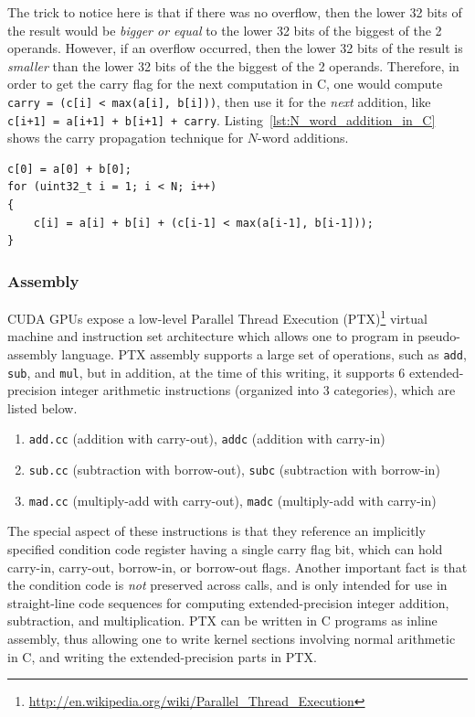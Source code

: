 \documentclass[12pt, a4paper]{report}
\begin{document}
\begin{sloppypar}
The trick to notice here is that if there was no overflow, then the lower 32
bits of the result would be \emph{bigger or equal} to the lower 32 bits of the
biggest of the 2 operands.
However, if an overflow occurred, then the lower 32 bits of the result is
\emph{smaller} than the lower 32 bits of the the biggest of the 2 operands.
Therefore, in order to get the carry flag for the next computation in C, one
would compute \verb!carry = (c[i] < max(a[i], b[i]))!, then use it for the
\emph{next} addition, like \verb!c[i+1] = a[i+1] + b[i+1] + carry!.
Listing~\ref{lst:N_word_addition_in_C} shows the carry propagation technique for
$N$-word additions.

\begin{lstlisting}
c[0] = a[0] + b[0];
for (uint32_t i = 1; i < N; i++)
{
    c[i] = a[i] + b[i] + (c[i-1] < max(a[i-1], b[i-1]));
}
\end{lstlisting}

\subsubsection{Assembly}
CUDA GPUs expose a low-level Parallel Thread Execution (PTX)\footnote{\url{http://en.wikipedia.org/wiki/Parallel_Thread_Execution}} virtual
machine and instruction set architecture which allows one to program in
pseudo-assembly language.
PTX assembly supports a large set of operations, such as \verb+add+, \verb+sub+,
and \verb+mul+, but in addition, at the time of this writing, it supports 6
extended-precision integer arithmetic instructions (organized into 3
categories), which are listed below.

\begin{enumerate}
\item \verb+add.cc+ (addition with carry-out), \verb+addc+ (addition with
carry-in)
\item \verb+sub.cc+ (subtraction with borrow-out), \verb+subc+ (subtraction with
borrow-in)
\item \verb+mad.cc+ (multiply-add with carry-out), \verb+madc+ (multiply-add
with carry-in)
\end{enumerate}

The special aspect of these instructions is that they reference an implicitly
specified condition code register having a single carry flag bit, which can hold
carry-in, carry-out, borrow-in, or borrow-out flags.
Another important fact is that the condition code is \emph{not} preserved across
calls, and is only intended for use in straight-line code sequences for
computing extended-precision integer addition, subtraction, and multiplication.
PTX can be written in C programs as inline assembly, thus allowing one to write
kernel sections involving normal arithmetic in C, and writing the
extended-precision parts in PTX.


\end{sloppypar}
\end{document}
